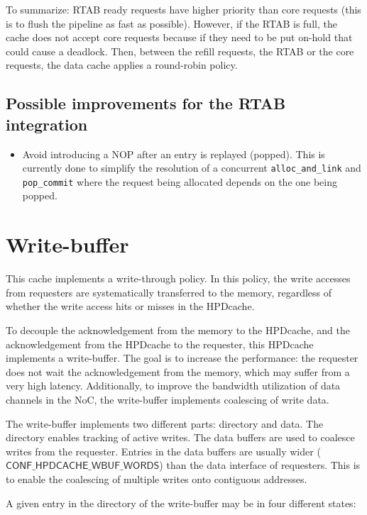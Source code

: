 \documentclass[10pt,titlepage,twoside]{book}
\begin{document}
To summarize: \ac{RTAB} ready requests have higher priority than core requests (this is to flush the pipeline as fast as possible).
However, if the \ac{RTAB} is full, the cache does not accept core requests because if they need to be put on-hold that could cause a deadlock.
Then, between the refill requests, the \ac{RTAB} or the core requests, the data cache applies a round-robin policy.

\subsection{Possible improvements for the \acs*{RTAB} integration}

\begin{itemize}
  \item Avoid introducing a NOP after an entry is replayed (popped).
  This is currently done to simplify the resolution of a concurrent \verb$alloc_and_link$ and \verb$pop_commit$ where the request being allocated depends on the one being popped.
\end{itemize}


\section{Write-buffer}

This cache implements a write-through policy.
In this policy, the write accesses from requesters are systematically transferred to the memory, regardless of whether the write access hits or misses in the \ac{HPDcache}.

To decouple the acknowledgement from the memory to the \ac{HPDcache}, and the acknowledgement from the \ac{HPDcache} to the requester, this \ac{HPDcache} implements a write-buffer.
The goal is to increase the performance: the requester does not wait the acknowledgement from the memory, which may suffer from a very high latency.
Additionally, to improve the bandwidth utilization of data channels in the \ac{NoC}, the write-buffer implements coalescing of write data.

The write-buffer implements two different parts: directory and data.
The directory enables tracking of active writes.
The data buffers are used to coalesce writes from the requester.
Entries in the data buffers are usually wider ($\mathsf{CONF\_HPDCACHE\_WBUF\_WORDS}$) than the data interface of requesters.
This is to enable the coalescing of multiple writes onto contiguous addresses.

A given entry in the directory of the write-buffer may be in four different states:
\end{document}
